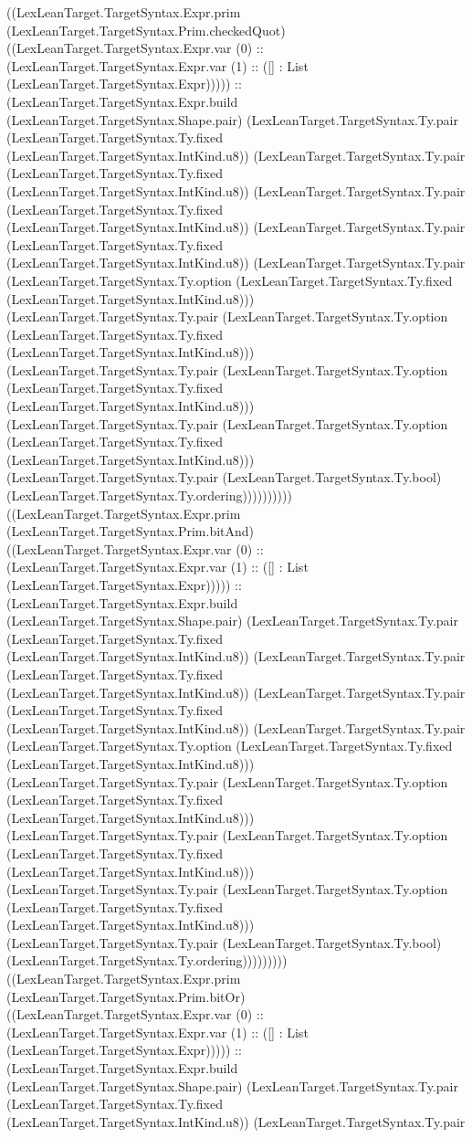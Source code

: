 \documentclass[11pt]{article}
\begin{document}
((LexLeanTarget.TargetSyntax.Expr.prim (LexLeanTarget.TargetSyntax.Prim.checkedQuot) ((LexLeanTarget.TargetSyntax.Expr.var (0) :: (LexLeanTarget.TargetSyntax.Expr.var (1) :: ([] : List (LexLeanTarget.TargetSyntax.Expr))))) :: (LexLeanTarget.TargetSyntax.Expr.build (LexLeanTarget.TargetSyntax.Shape.pair) (LexLeanTarget.TargetSyntax.Ty.pair (LexLeanTarget.TargetSyntax.Ty.fixed (LexLeanTarget.TargetSyntax.IntKind.u8)) (LexLeanTarget.TargetSyntax.Ty.pair (LexLeanTarget.TargetSyntax.Ty.fixed (LexLeanTarget.TargetSyntax.IntKind.u8)) (LexLeanTarget.TargetSyntax.Ty.pair (LexLeanTarget.TargetSyntax.Ty.fixed (LexLeanTarget.TargetSyntax.IntKind.u8)) (LexLeanTarget.TargetSyntax.Ty.pair (LexLeanTarget.TargetSyntax.Ty.fixed (LexLeanTarget.TargetSyntax.IntKind.u8)) (LexLeanTarget.TargetSyntax.Ty.pair (LexLeanTarget.TargetSyntax.Ty.option (LexLeanTarget.TargetSyntax.Ty.fixed (LexLeanTarget.TargetSyntax.IntKind.u8))) (LexLeanTarget.TargetSyntax.Ty.pair (LexLeanTarget.TargetSyntax.Ty.option (LexLeanTarget.TargetSyntax.Ty.fixed (LexLeanTarget.TargetSyntax.IntKind.u8))) (LexLeanTarget.TargetSyntax.Ty.pair (LexLeanTarget.TargetSyntax.Ty.option (LexLeanTarget.TargetSyntax.Ty.fixed (LexLeanTarget.TargetSyntax.IntKind.u8))) (LexLeanTarget.TargetSyntax.Ty.pair (LexLeanTarget.TargetSyntax.Ty.option (LexLeanTarget.TargetSyntax.Ty.fixed (LexLeanTarget.TargetSyntax.IntKind.u8))) (LexLeanTarget.TargetSyntax.Ty.pair (LexLeanTarget.TargetSyntax.Ty.bool) (LexLeanTarget.TargetSyntax.Ty.ordering)))))))))) ((LexLeanTarget.TargetSyntax.Expr.prim (LexLeanTarget.TargetSyntax.Prim.bitAnd) ((LexLeanTarget.TargetSyntax.Expr.var (0) :: (LexLeanTarget.TargetSyntax.Expr.var (1) :: ([] : List (LexLeanTarget.TargetSyntax.Expr))))) :: (LexLeanTarget.TargetSyntax.Expr.build (LexLeanTarget.TargetSyntax.Shape.pair) (LexLeanTarget.TargetSyntax.Ty.pair (LexLeanTarget.TargetSyntax.Ty.fixed (LexLeanTarget.TargetSyntax.IntKind.u8)) (LexLeanTarget.TargetSyntax.Ty.pair (LexLeanTarget.TargetSyntax.Ty.fixed (LexLeanTarget.TargetSyntax.IntKind.u8)) (LexLeanTarget.TargetSyntax.Ty.pair (LexLeanTarget.TargetSyntax.Ty.fixed (LexLeanTarget.TargetSyntax.IntKind.u8)) (LexLeanTarget.TargetSyntax.Ty.pair (LexLeanTarget.TargetSyntax.Ty.option (LexLeanTarget.TargetSyntax.Ty.fixed (LexLeanTarget.TargetSyntax.IntKind.u8))) (LexLeanTarget.TargetSyntax.Ty.pair (LexLeanTarget.TargetSyntax.Ty.option (LexLeanTarget.TargetSyntax.Ty.fixed (LexLeanTarget.TargetSyntax.IntKind.u8))) (LexLeanTarget.TargetSyntax.Ty.pair (LexLeanTarget.TargetSyntax.Ty.option (LexLeanTarget.TargetSyntax.Ty.fixed (LexLeanTarget.TargetSyntax.IntKind.u8))) (LexLeanTarget.TargetSyntax.Ty.pair (LexLeanTarget.TargetSyntax.Ty.option (LexLeanTarget.TargetSyntax.Ty.fixed (LexLeanTarget.TargetSyntax.IntKind.u8))) (LexLeanTarget.TargetSyntax.Ty.pair (LexLeanTarget.TargetSyntax.Ty.bool) (LexLeanTarget.TargetSyntax.Ty.ordering))))))))) ((LexLeanTarget.TargetSyntax.Expr.prim (LexLeanTarget.TargetSyntax.Prim.bitOr) ((LexLeanTarget.TargetSyntax.Expr.var (0) :: (LexLeanTarget.TargetSyntax.Expr.var (1) :: ([] : List (LexLeanTarget.TargetSyntax.Expr))))) :: (LexLeanTarget.TargetSyntax.Expr.build (LexLeanTarget.TargetSyntax.Shape.pair) (LexLeanTarget.TargetSyntax.Ty.pair (LexLeanTarget.TargetSyntax.Ty.fixed (LexLeanTarget.TargetSyntax.IntKind.u8)) (LexLeanTarget.TargetSyntax.Ty.pair 
\end{document}
